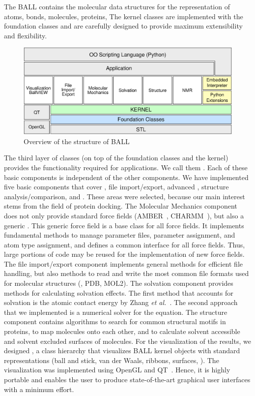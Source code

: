 The BALL  contains the molecular data structures for the
representation of atoms, bonds, molecules, proteins, \etc  The kernel classes
are implemented with the foundation classes and are carefully designed to
provide maximum extensibility and flexibility.
\begin{figure}[tb]
  \centering\includegraphics[width=\textwidth]{BALL_structure.eps}
  \caption{Overview of the structure of BALL}
  \label{fig:BALL_structure}
\end{figure}

The third layer of classes (on top of the foundation classes and the kernel)
provides the functionality required for applications. We call them
. Each of these basic components is independent of
the other components.  We have implemented five basic components that cover
, file import/export, advanced , structure analysis/comparison, and . These
areas were selected, because our main interest stems from the field of protein
docking. The Molecular Mechanics component does not only provide standard
force fields (AMBER~\cite{AMBER95}, CHARMM~\cite{BBO+83}), but also a generic
.  This generic force field is a base class for all force
fields. It implements fundamental methods to manage parameter files, parameter
assignment, and atom type assignment, and defines a common interface for all
force fields. Thus, large portions of code may be reused for the
implementation of new force fields.  The file import/export component
implements general methods for efficient file handling, but also methods to
read and write the most common file formats used for molecular structures
(\eg, PDB, MOL2). The solvation component provides methods for calculating
solvation effects. The first method that accounts for solvation is the atomic
contact energy by Zhang {\it et al.}~\cite{ZVC+97}. The second approach that
we implemented is a numerical solver for the  equation.  The
structure component contains algorithms to search for common structural motifs
in proteins, to map molecules onto each other, and to calculate solvent
accessible and solvent excluded surfaces of molecules. For the visualization
of the results, we designed , a class hierarchy that
visualizes BALL kernel objects with standard representations (ball and stick,
van der Waals, ribbons, surfaces, \etc). The visualization was implemented
using OpenGL and QT~\cite{QT}. Hence, it is highly portable and enables the
user to produce state-of-the-art graphical user interfaces with a minimum
effort.


